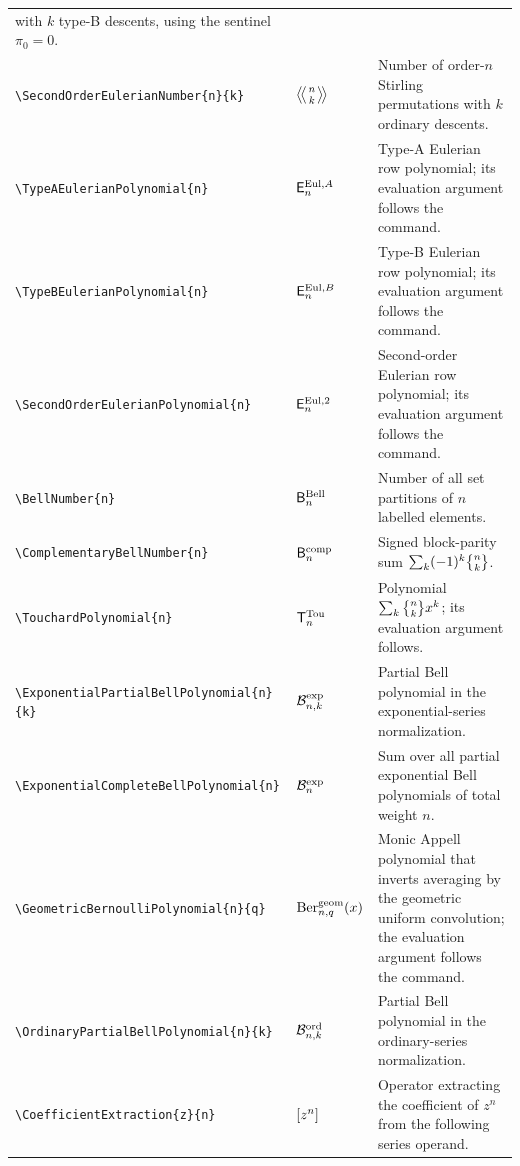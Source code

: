 \documentclass[11pt,oneside]{article}
\theoremstyle{definition}
\theoremstyle{remark}
\DeclareRobustCommand{\commandname}[1]{\texttt{\textbackslash#1}}
\begin{document}
\begin{longtable}{@{}S{0.35\textwidth}L{0.14\textwidth}L{0.45\textwidth}@{}}
with \(k\) type-B descents, using the sentinel \(\pi_0=0\).\\
\commandname{SecondOrderEulerianNumber}\texttt{\{n\}\{k\}} &
\(\SecondOrderEulerianNumber{n}{k}\) & Number of order-\(n\) Stirling
permutations with \(k\) ordinary descents.\\
\commandname{TypeAEulerianPolynomial}\texttt{\{n\}} &
\(\mathsf{E}^{\mathrm{Eul},A}_{n}\) & Type-A Eulerian row polynomial; its
evaluation argument follows the command.\\
\commandname{TypeBEulerianPolynomial}\texttt{\{n\}} &
\(\mathsf{E}^{\mathrm{Eul},B}_{n}\) & Type-B Eulerian row polynomial; its
evaluation argument follows the command.\\
\commandname{SecondOrderEulerianPolynomial}\texttt{\{n\}} &
\(\mathsf{E}^{\mathrm{Eul},2}_{n}\) & Second-order Eulerian row polynomial;
its evaluation argument follows the command.\\
\commandname{BellNumber}\texttt{\{n\}} & \(\mathsf{B}^{\mathrm{Bell}}_{n}\) & Number of all
set partitions of \(n\) labelled elements.\\
\commandname{ComplementaryBellNumber}\texttt{\{n\}} &
\(\mathsf{B}^{\mathrm{comp}}_{n}\) & Signed block-parity sum
\(\sum_k(-1)^k\StirlingSecondKind{n}{k}\).\\
\commandname{TouchardPolynomial}\texttt{\{n\}} &
\(\mathsf{T}^{\mathrm{Tou}}_{n}\) & Polynomial
\(\sum_k\StirlingSecondKind{n}{k}x^k\); its evaluation argument follows.\\
\commandname{ExponentialPartialBellPolynomial}\texttt{\{n\}\{k\}} &
\(\mathcal{B}^{\mathrm{exp}}_{n,k}\) & Partial Bell polynomial in the
exponential-series normalization.\\
\commandname{ExponentialCompleteBellPolynomial}\texttt{\{n\}} &
\(\mathcal{B}^{\mathrm{exp}}_{n}\) & Sum over all partial exponential
Bell polynomials of total weight \(n\).\\
\commandname{GeometricBernoulliPolynomial}\texttt{\{n\}\{q\}} &
\(\mathrm{Ber}^{\mathrm{geom}}_{n,q}(x)\) & Monic Appell polynomial that
inverts averaging by the geometric uniform convolution; the evaluation
argument follows the command.\\
\commandname{OrdinaryPartialBellPolynomial}\texttt{\{n\}\{k\}} &
\(\mathcal{B}^{\mathrm{ord}}_{n,k}\) & Partial Bell polynomial in the
ordinary-series normalization.\\
\commandname{CoefficientExtraction}\texttt{\{z\}\{n\}} &
\(\left[z^{n}\right]\) & Operator extracting the coefficient of
\(z^n\) from the following series operand.\\

\end{longtable}
\end{document}
